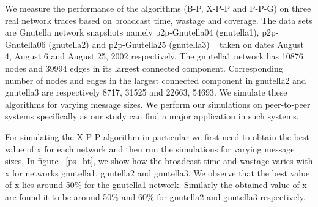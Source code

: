 We measure 
the performance of the algorithms (B-P, X-P-P and P-P-G) on three real network traces based on broadcast time, 
wastage and coverage. The data sets are Gnutella network snapshots namely 
p2p-Gnutella04 (gnutella1), p2p-Gnutella06 (gnutella2) and p2p-Gnutella25 (gnutella3) ~\cite{leskovec2007graph,ripeanu2002mapping} taken on dates August 4, August 6 and August 25, 2002 respectively. 
The gnutella1 network has 10876 nodes and 39994 edges in its largest connected component. Corresponding number of nodes and edges in the largest connected component 
in gnutella2 and gnutella3 are respectively 8717, 31525 and 22663, 54693. We simulate these algorithms for varying message sizes.
We perform our simulations on peer-to-peer systems specifically as our study can find a major application in such systems.

For simulating the X-P-P algorithm in particular we first need to obtain the best value of x for each network and then run the simulations for varying message sizes. 
 In figure ~\ref{ps_bt}, we show how the broadcast time and wastage varies with x for networks gnutella1, gnutella2 and gnutella3. We observe that the best value of x lies around 
 50\% for the gnutella1 network. Similarly the obtained value of x are found it to be around 50\% and 60\% for gnutella2 and gnutella3 
 respectively.
% 
